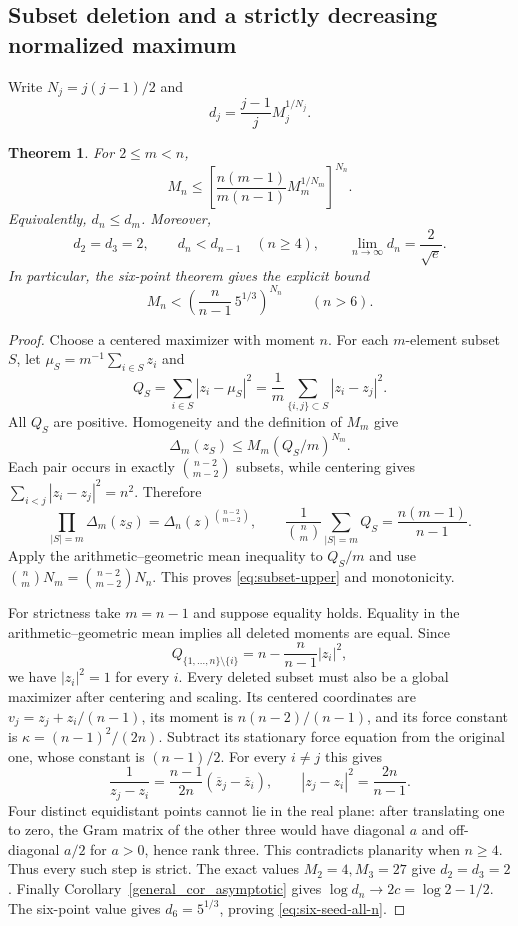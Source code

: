 \documentclass[11pt]{article}
\newtheorem{theorem}{Theorem}[section]
\theoremstyle{remark}
\numberwithin{equation}{section}
\begin{document}
\subsection{Subset deletion and a strictly decreasing normalized maximum}
Write $N_j=j(j-1)/2$ and
\[
 d_j=\frac{j-1}{j}M_j^{1/N_j}.
\]
\begin{theorem}\label{thm:subset-monotonic}
For $2\le m<n$,
\begin{equation}\label{eq:subset-upper}
 M_n\le
 \left[\frac{n(m-1)}{m(n-1)}M_m^{1/N_m}\right]^{N_n}.
\end{equation}
Equivalently, $d_n\le d_m$. Moreover,
\[
 d_2=d_3=2,\qquad d_n<d_{n-1}\quad(n\ge4),\qquad
 \lim_{n\to\infty}d_n=\frac2{\sqrt e}.
\]
In particular, the six-point theorem gives the explicit bound
\begin{equation}\label{eq:six-seed-all-n}
 M_n<\left(\frac{n}{n-1}\,5^{1/3}\right)^{N_n}
 \qquad(n>6).
\end{equation}
\end{theorem}
\begin{proof}
Choose a centered maximizer with moment $n$. For each $m$-element
subset $S$, let $\mu_S=m^{-1}\sum_{i\in S}z_i$ and
\[
 Q_S=\sum_{i\in S}|z_i-\mu_S|^2
     =\frac1m\sum_{\{i,j\}\subset S}|z_i-z_j|^2.
\]
All $Q_S$ are positive. Homogeneity and the definition of $M_m$ give
\[
 \Delta_m(z_S)\le M_m(Q_S/m)^{N_m}.
\]
Each pair occurs in exactly $\binom{n-2}{m-2}$ subsets, while
centering gives $\sum_{i<j}|z_i-z_j|^2=n^2$. Therefore
\[
 \prod_{|S|=m}\Delta_m(z_S)
   =\Delta_n(z)^{\binom{n-2}{m-2}},\qquad
 \frac1{\binom nm}\sum_{|S|=m}Q_S
   =\frac{n(m-1)}{n-1}.
\]
Apply the arithmetic--geometric mean inequality to $Q_S/m$ and
use $\binom nm N_m=\binom{n-2}{m-2}N_n$. This proves
\eqref{eq:subset-upper} and monotonicity.

For strictness take $m=n-1$ and suppose equality holds. Equality
in the arithmetic--geometric mean implies all deleted moments are
equal. Since
\[
 Q_{\{1,\ldots,n\}\setminus\{i\}}
  =n-\frac n{n-1}|z_i|^2,
\]
we have $|z_i|^2=1$ for every $i$. Every deleted subset must also
be a global maximizer after centering and scaling. Its centered
coordinates are $v_j=z_j+z_i/(n-1)$, its moment is
$n(n-2)/(n-1)$, and its force constant is
$\kappa=(n-1)^2/(2n)$. Subtract its stationary force equation from
the original one, whose constant is $(n-1)/2$. For every $i\ne j$
this gives
\[
 \frac1{z_j-z_i}
 =\frac{n-1}{2n}(\overline z_j-\overline z_i),\qquad
 |z_j-z_i|^2=\frac{2n}{n-1}.
\]
Four distinct equidistant points cannot lie in the real plane:
after translating one to zero, the Gram matrix of the other three
would have diagonal $a$ and off-diagonal $a/2$ for $a>0$, hence rank
three. This contradicts planarity when $n\ge4$. Thus every such
step is strict. The exact values $M_2=4,M_3=27$ give $d_2=d_3=2$.
Finally Corollary~\ref{general_cor_asymptotic} gives
$\log d_n\to2c=\log2-1/2$. The six-point value gives
$d_6=5^{1/3}$, proving \eqref{eq:six-seed-all-n}.
\end{proof}
\end{document}
